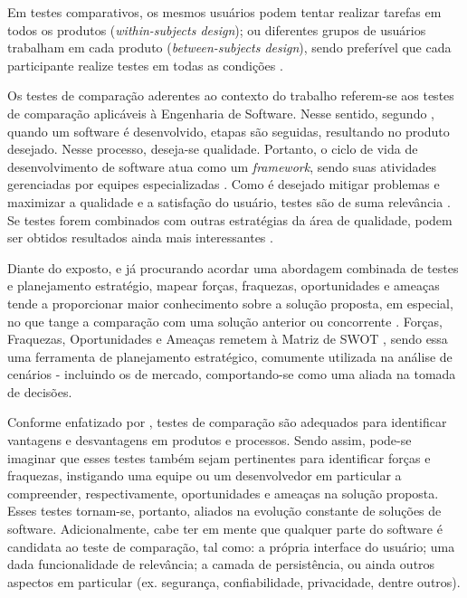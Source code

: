 Em testes comparativos, os mesmos usuários podem tentar realizar tarefas em todos os produtos (\textit{within-subjects design}); ou diferentes grupos de usuários trabalham em cada 
produto (\textit{between-subjects design}), sendo preferível que cada participante realize testes em todas as condições \cite{lewis2016}. 

Os testes de comparação aderentes ao contexto do trabalho referem-se aos testes de comparação aplicáveis à Engenharia de Software. Nesse sentido, segundo , quando um 
software é desenvolvido, etapas são seguidas, resultando no produto desejado. Nesse processo, deseja-se qualidade. Portanto, o ciclo de vida de desenvolvimento de software atua como 
um \textit{framework}, sendo suas atividades gerenciadas por equipes especializadas \cite{pressman2021}. Como é desejado mitigar problemas e maximizar a qualidade e a satisfação do usuário, testes são de 
suma relevância \cite{delamaro2013}. Se testes forem combinados com outras estratégias da área de qualidade, podem ser obtidos resultados ainda mais interessantes \cite{damo2020} \cite{cintra2022} \cite{akinyemi2020}.

Diante do exposto, e já procurando acordar uma abordagem combinada de testes e planejamento estratégio, mapear forças, fraquezas, oportunidades e ameaças tende a proporcionar maior conhecimento 
sobre a solução proposta, em especial, no que tange a comparação com uma solução anterior ou concorrente \cite{damo2020} \cite{akinyemi2020}. Forças, Fraquezas, Oportunidades e Ameaças remetem à Matriz de SWOT \cite{fernandes2015}, 
sendo essa uma ferramenta de planejamento estratégico, comumente utilizada na análise de cenários - incluindo os de mercado, comportando-se como uma aliada na tomada de decisões. 

Conforme enfatizado por , testes de comparação são adequados para identificar vantagens e desvantagens em produtos e processos. Sendo assim, pode-se imaginar que esses testes também sejam pertinentes para 
identificar forças e fraquezas, instigando uma equipe ou um desenvolvedor em particular a compreender, respectivamente, oportunidades e ameaças na solução proposta. Esses testes tornam-se, portanto, 
aliados na evolução constante de soluções de software. Adicionalmente, cabe ter em mente que qualquer parte do software é candidata ao teste de comparação, tal como: a própria interface do usuário; 
uma dada funcionalidade de relevância; a camada de persistência, ou ainda outros aspectos em particular (ex. segurança, confiabilidade, privacidade, dentre outros).

